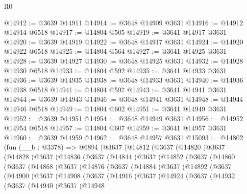 \begin{lexlean}{R0}
\begin{coremodule}
@14912 := @3639 @14911
@14914 := @3648 @14909 @3631
@14916 := @14912 @14914 @6518
@14917 := @14804 @505
@14919 := @3641 @14917 @3631
@14920 := @3639 @14919
@14922 := @3648 @14917 @3631
@14924 := @14920 @14922 @6518
@14925 := @14804 @564
@14927 := @3641 @14925 @3631
@14928 := @3639 @14927
@14930 := @3648 @14925 @3631
@14932 := @14928 @14930 @6518
@14933 := @14804 @592
@14935 := @3641 @14933 @3631
@14936 := @3639 @14935
@14938 := @3648 @14933 @3631
@14940 := @14936 @14938 @6518
@14941 := @14804 @597
@14943 := @3641 @14941 @3631
@14944 := @3639 @14943
@14946 := @3648 @14941 @3631
@14948 := @14944 @14946 @6518
@14949 := @14804 @602
@14951 := @3641 @14949 @3631
@14952 := @3639 @14951
@14954 := @3648 @14949 @3631
@14956 := @14952 @14954 @6518
@14957 := @14804 @607
@14959 := @3641 @14957 @3631
@14960 := @3639 @14959
@14962 := @3648 @14957 @3631
@15093 := @14802
    (fun (__b : @3378) =>
    @6894
      (@3637
        (@14812
          (@3637
            (@14820
              (@3637
                (@14828
                  (@3637
                    (@14836
                      (@3637
                        (@14844
                          (@3637
                            (@14852
                              (@3637
                                (@14860
                                  (@3637
                                    (@14868
                                      (@3637
                                        (@14876
                                          (@3637
                                            (@14884
                                              (@3637
                                                (@14892
                                                  (@3637
                                                    (@14900
                                                      (@3637
                                                        (@14908
                                                          (@3637
                                                            (@14916
                                                              (@3637
                                                                (@14924
                                                                  (@3637
                                                                    (@14932
                                                                      (@3637
                                                                        (@14940
                                                                          (@3637
                                                                            (@14948

\end{coremodule}
\end{lexlean}
